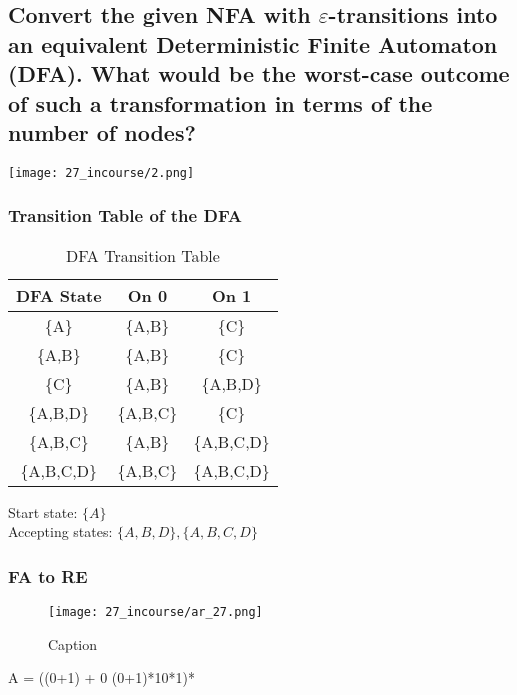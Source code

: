 \documentclass[8pt]{article}
\begin{document}
\subsection{Convert the given NFA with \(\varepsilon\)-transitions into an equivalent Deterministic Finite Automaton (DFA). What would be the worst-case outcome of such a transformation in terms of the number of nodes?}

\begin{center}
    \texttt{[image: 27\_incourse/2.png]} %
\end{center}
\subsubsection{Transition Table of the DFA}


\begin{table}[h!]
    \centering
    \renewcommand{\arraystretch}{1.3} %
    \begin{tabular}{|c|c|c|}
        \hline
        \rowcolor{gray!20} %
        \textbf{DFA State} & \textbf{On 0} & \textbf{On 1} \\
        \hline
        \{A\} & \{A,B\} & \{C\} \\
        \hline
        \{A,B\} & \{A,B\} & \{C\} \\
        \hline
        \{C\} & \{A,B\} & \{A,B,D\} \\
        \hline
        \{A,B,D\} & \{A,B,C\} & \{C\} \\
        \hline
        \{A,B,C\} & \{A,B\} & \{A,B,C,D\} \\
        \hline
        \{A,B,C,D\} & \{A,B,C\} & \{A,B,C,D\} \\
        \hline
    \end{tabular}
    \caption{DFA Transition Table}
    \label{tab:dfa_transition}
\end{table}

Start state: $\{A\}$ \\
Accepting states: $\{A,B,D\}, \{A,B,C,D\}$
\subsubsection{FA to RE}
\begin{figure}[H]
    \centering
    \texttt{[image: 27\_incourse/ar\_27.png]}
    \caption{Caption}
    \label{fig:placeholder}
\end{figure}
A = ((0+1) + 0 (0+1)*10*1)*
\end{document}
